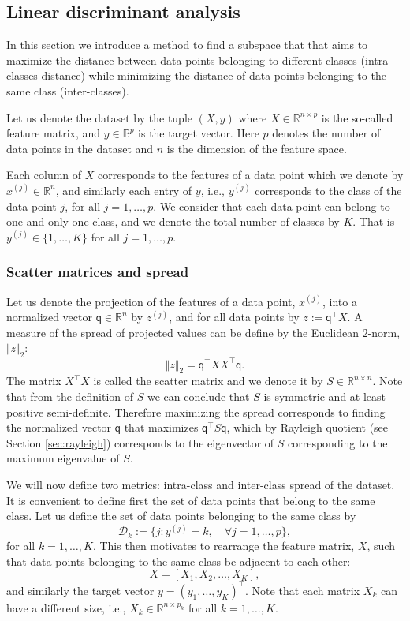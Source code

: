 \documentclass[11pt]{article}
\newcommand{\R}{\mathbb{R}}
\newcommand{\B}{\mathbb{B}}
\newcommand{\D}{\mathcal{D}}
\newcommand{\q}{\textsf{q}}
\newcommand{\norm}[1]{\Vert #1 \Vert}
\begin{document}
\subsection{Linear discriminant analysis}
In this section we introduce a method to find a subspace that that
aims to maximize the distance between data points belonging to
different classes (intra-classes distance) while minimizing the
distance of data points belonging to the same class (inter-classes).

Let us denote the dataset by the tuple $(X, y)$ where $X \in \R^{n
  \times p}$ is the so-called feature matrix, and $y \in \B^{p}$ is
the target vector. Here $p$ denotes the number of data points in the
dataset and $n$ is the dimension of the feature space.

Each column of $X$ corresponds to the features of a data point which
we denote by $x^{(j)} \in \R^{n}$, and similarly each entry of $y$,
i.e., $y^{(j)}$ corresponds to the class of the data point $j$, for
all $j=1,\dots, p$. We consider that each data point can belong to one
and only one class, and we denote the total number of classes by
$K$. That is $y^{(j)} \in \{1,\dots, K\}$ for all $j=1,\dots, p$.

\subsubsection{Scatter matrices and spread}
Let us denote the projection of the features of a data point,
$x^{(j)}$, into a normalized vector $\q \in \R^{n}$ by $z^{(j)}$, and
for all data points by $z := \q^\top X$. A measure of the spread of
projected values can be define by the Euclidean $2$-norm,
$\norm{z}_2$:
\begin{equation}
  \norm{z}_2 = \q^\top X X^\top \q.
\end{equation}
The matrix $X^\top X$ is called the scatter matrix and we denote it by
$S \in \R^{n\times n}$. Note that from the definition of $S$ we can
conclude that $S$ is symmetric and at least positive
semi-definite. Therefore maximizing the spread corresponds to finding
the normalized vector $\q$ that maximizes $\q^\top S \q$, which by
Rayleigh quotient (see Section \ref{sec:rayleigh}) corresponds to the
eigenvector of $S$ corresponding to the maximum eigenvalue of $S$.

We will now define two metrics: intra-class and inter-class spread of
the dataset. It is convenient to define first the set of data points
that belong to the same class. Let us define the set of data points
belonging to the same class by
\begin{equation}
  \D_k := \big\{ j : y^{(j)} = k, \quad \forall j=1,\dots,p \big\},
\end{equation}
for all $k = 1, \dots, K$. This then motivates to rearrange the
feature matrix, $X$, such that data points belonging to the same class
be adjacent to each other:
\begin{equation}
  X = [X_1, X_2, \dots, X_K],
\end{equation}
and similarly the target vector $y = (y_1, \dots, y_K)^\top$. Note
that each matrix $X_k$ can have a different size, i.e., $X_k \in \R^{n
  \times p_k}$ for all $k = 1, \dots, K$.
\end{document}
